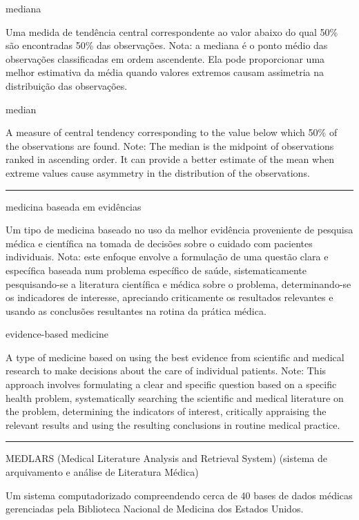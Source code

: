 \documentclass[
]{book}
\begin{document}
mediana

Uma medida de tendência central correspondente ao valor abaixo do qual 50\% são encontradas 50\% das observações. Nota: a mediana é o ponto médio das observações classificadas em ordem ascendente. Ela pode proporcionar uma melhor estimativa da média quando valores extremos causam assimetria na distribuição das observações.

median

A measure of central tendency corresponding to the value below which 50\% of the observations are found. Note: The median is the midpoint of observations ranked in ascending order. It can provide a better estimate of the mean when extreme values cause asymmetry in the distribution of the observations.

\begin{center}\rule{0.5\linewidth}{0.5pt}\end{center}

medicina baseada em evidências

Um tipo de medicina baseado no uso da melhor evidência proveniente de pesquisa médica e científica na tomada de decisões sobre o cuidado com pacientes individuais. Nota: este enfoque envolve a formulação de uma questão clara e específica baseada num problema específico de saúde, sistematicamente pesquisando-se a literatura científica e médica sobre o problema, determinando-se os indicadores de interesse, apreciando criticamente os resultados relevantes e usando as conclusões resultantes na rotina da prática médica.

evidence-based medicine

A type of medicine based on using the best evidence from scientific and medical research to make decisions about the care of individual patients. Note: This approach involves formulating a clear and specific question based on a specific health problem, systematically searching the scientific and medical literature on the problem, determining the indicators of interest, critically appraising the relevant results and using the resulting conclusions in routine medical practice.

\begin{center}\rule{0.5\linewidth}{0.5pt}\end{center}

MEDLARS (Medical Literature Analysis and Retrieval System) (sistema de arquivamento e análise de Literatura Médica)

Um sistema computadorizado compreendendo cerca de 40 bases de dados médicas gerenciadas pela Biblioteca Nacional de Medicina dos Estados Unidos.
\end{document}
